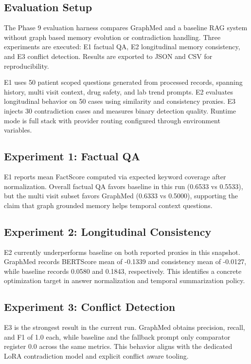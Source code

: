 \documentclass[conference]{IEEEtran}
\begin{document}
\subsection{Evaluation Setup}
The Phase 9 evaluation harness compares GraphMed and a baseline RAG system without graph based memory evolution or contradiction handling. Three experiments are executed: E1 factual QA, E2 longitudinal memory consistency, and E3 conflict detection. Results are exported to JSON and CSV for reproducibility.

E1 uses 50 patient scoped questions generated from processed records, spanning history, multi visit context, drug safety, and lab trend prompts. E2 evaluates longitudinal behavior on 50 cases using similarity and consistency proxies. E3 injects 30 contradiction cases and measures binary detection quality. Runtime mode is full stack with provider routing configured through environment variables.

\subsection{Experiment 1: Factual QA}
E1 reports mean FactScore computed via expected keyword coverage after normalization. Overall factual QA favors baseline in this run (0.6533 vs 0.5533), but the multi visit subset favors GraphMed (0.6333 vs 0.5000), supporting the claim that graph grounded memory helps temporal context questions.

\subsection{Experiment 2: Longitudinal Consistency}
E2 currently underperforms baseline on both reported proxies in this snapshot. GraphMed records BERTScore mean of -0.1339 and consistency mean of -0.0127, while baseline records 0.0580 and 0.1843, respectively. This identifies a concrete optimization target in answer normalization and temporal summarization policy.

\subsection{Experiment 3: Conflict Detection}
E3 is the strongest result in the current run. GraphMed obtains precision, recall, and F1 of 1.0 each, while baseline and the fallback prompt only comparator register 0.0 across the same metrics. This behavior aligns with the dedicated LoRA contradiction model and explicit conflict aware tooling.
\end{document}
